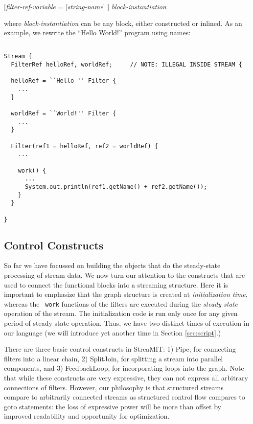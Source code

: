\documentclass[draft]{article}
\begin{document}
[{\it filter-ref-variable} = [{\it string-name}] ] {\it block-instantiation}

where {\it block-instantiation} can be any block, either constructed
or inlined.  As an example, we rewrite the ``Hello World!'' program
using names:

\begin{verbatim} 

Stream {
  FilterRef helloRef, worldRef;		// NOTE: ILLEGAL INSIDE STREAM {

  helloRef = ``Hello '' Filter {
	...
  }

  worldRef = ``World!'' Filter {
	...
  }

  Filter(ref1 = helloRef, ref2 = worldRef) {
    ...
    
    work() {
      ...
      System.out.println(ref1.getName() + ref2.getName());
    }
  }

}

\end{verbatim}

\subsection{Control Constructs}
\protect\label{sec:control}

So far we have focussed on building the objects that do the
steady-state processing of stream data.  We now turn our attention to
the constructs that are used to connect the functional blocks into a
streaming structure.  Here it is important to emphasize that the graph
structure is created at {\it initialization time}, whereas the {\tt
work} functions of the filters are executed during the {\it steady
state} operation of the stream.  The initialization code is run only
once for any given period of steady state operation.  Thus, we have
two distinct times of execution in our language (we will introduce yet
another time in Section {\ref{sec:script}}.)

There are three basic control constructs in StreaMIT: 1) Pipe, for
connecting filters into a linear chain, 2) SplitJoin, for splitting a
stream into parallel components, and 3) FeedbackLoop, for
incorporating loops into the graph.  Note that while these constructs
are very expressive, they can not express all arbitrary connections of
filters.  However, our philosophy is that structured streams compare
to arbitrarily connected streams as structured control flow compares
to goto statements: the loss of expressive power will be more than
offset by improved readability and opportunity for optimization.
\end{document}
